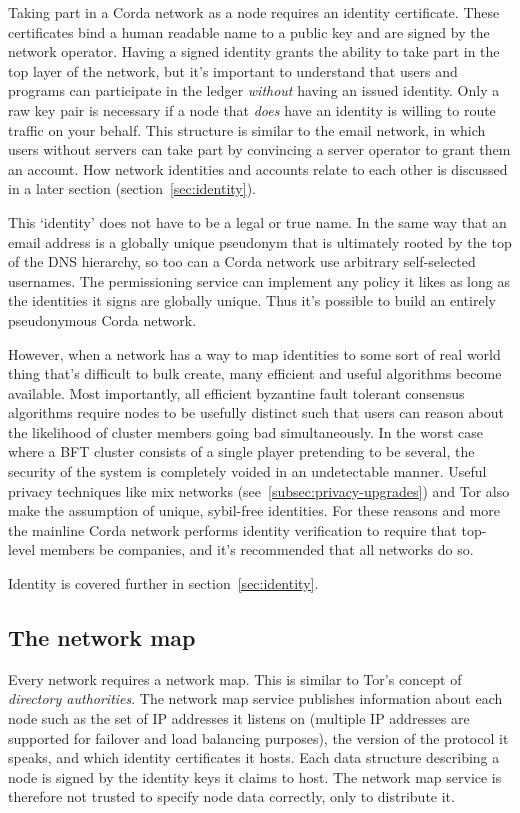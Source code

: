 \documentclass{article}
\begin{document}
Taking part in a Corda network as a node requires an identity certificate. These certificates bind a human readable
name to a public key and are signed by the network operator. Having a signed identity grants the ability to take
part in the top layer of the network, but it's important to understand that users and programs can participate in the ledger
\emph{without} having an issued identity. Only a raw key pair is necessary if a node that \emph{does} have an
identity is willing to route traffic on your behalf. This structure is similar to the email network, in which users
without servers can take part by convincing a server operator to grant them an account. How network identities and
accounts relate to each other is discussed in a later section (section~\cref{sec:identity}).

This `identity' does not have to be a legal or true name. In the same way that an email address is a globally
unique pseudonym that is ultimately rooted by the top of the DNS hierarchy, so too can a Corda network use
arbitrary self-selected usernames. The permissioning service can implement any policy it likes as long as the
identities it signs are globally unique. Thus it's possible to build an entirely pseudonymous Corda network.

However, when a network has a way to map identities to some sort of real world thing that's difficult to bulk create,
many efficient and useful algorithms become available. Most importantly, all efficient byzantine fault tolerant
consensus algorithms require nodes to be usefully distinct such that users can reason about the likelihood of cluster
members going bad simultaneously. In the worst case where a BFT cluster consists of a single player pretending to be
several, the security of the system is completely voided in an undetectable manner. Useful privacy techniques like
mix networks (see~\cref{subsec:privacy-upgrades}) and Tor\cite{Dingledine:2004:TSO:1251375.1251396} also make the assumption of unique, sybil-free
identities. For these reasons and more the mainline Corda network performs identity verification to require that
top-level members be companies, and it's recommended that all networks do so.

Identity is covered further in section~\cref{sec:identity}.

\subsection{The network map}

Every network requires a network map. This is similar to Tor's concept of \emph{directory authorities}. The network
map service publishes information about each node such as the set of IP addresses it listens on (multiple IP
addresses are supported for failover and load balancing purposes), the version of the protocol it speaks, and which
identity certificates it hosts. Each data structure describing a node is signed by the identity keys it claims to
host. The network map service is therefore not trusted to specify node data correctly, only to distribute it.
\end{document}
